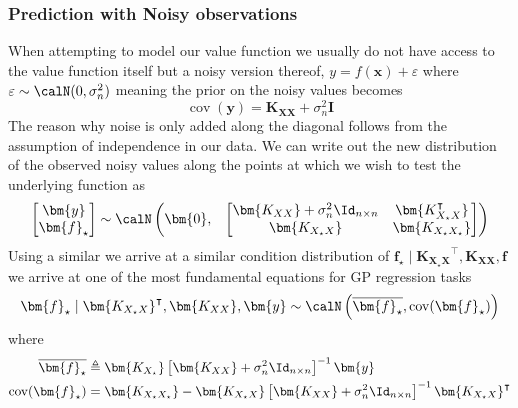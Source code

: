 \subsubsection{Prediction with Noisy observations}\label{Section1.5.2}
When attempting to model our value function we usually do not have access to the value function itself but a noisy version thereof, $y = f(\bm{x}) + \varepsilon$ where $\varepsilon \sim \calN (0, \sigma_n^2)$ meaning the prior on the noisy values becomes
\[
    \operatorname{cov} (\bm{y}) = \bm{K_{XX}} + \sigma_n^2 \bm{I}
\]
The reason why noise is only added along the diagonal follows from the assumption of independence in our data.
We can write out the new distribution of the observed noisy values along the points at which we wish to test the underlying function as
\[
    \begin{bmatrix}
        \bm{y} \\
        \bm{f}_{\star}
    \end{bmatrix}
    \sim \calN
    \begin{pmatrix}
        \bm{0}, &
        {
                \begin{bmatrix}
                    \bm{K_{XX}} + \sigma_n^2 \Id_{n \times n} & \bm{K_{X_{\star}X}^{\intercal}} \\
                    \bm{K_{X_{\star}X}}                       & \bm{K_{X_{\star}X_{\star}}}
                \end{bmatrix}
            }
    \end{pmatrix}
\]
Using a similar we arrive at a similar condition distribution of $\bm{f}_{\star} \mid \bm{K_{X_{\star}X}}^{\intercal} , \bm{K_{XX}}, \bm{f}$ we arrive at one of the most fundamental equations for GP regression tasks
\begin{equation}\label{prop:GP_train_distr2}
    \bm{f}_{\star} \mid \bm{K_{X_{\star}X}}^{\intercal} , \bm{K_{XX}}, \bm{y} \sim \calN \left( \overline{\bm{f}_{\star}}, \operatorname{cov} (\bm{f}_{\star}) \right)
\end{equation}
where
\begin{align}
    \overline{\bm{f}_{\star}}           & \triangleq \bm{K_{X_{\star}}} \left[ \bm{K_{XX}} + \sigma_n^2 \Id_{n \times n} \right]^{-1} \bm{y} \label{eq: GP_train_distr2_mean}                                               \\
    \operatorname{cov} (\bm{f}_{\star}) & = \bm{K_{X_{\star}X_{\star}}} - \bm{K_{X_{\star}X}} \left[ \bm{K_{XX}} + \sigma_n^2 \Id_{n \times n} \right]^{-1} \bm{K_{X_{\star}X}}^{\intercal} \label{eq: GP_train_distr2_var}
\end{align}
